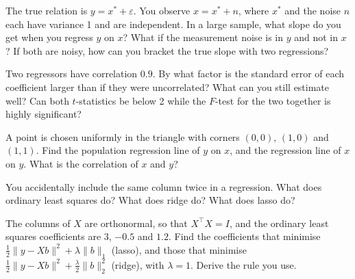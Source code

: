 \begin{question}\label{iq:iv1:regression:10}
The true relation is $y = x^* + \varepsilon$. You observe $x = x^* + n$, where $x^*$ and the noise $n$ each have variance 1 and are independent. In a large sample, what slope do you get when you regress $y$ on $x$? What if the measurement noise is in $y$ and not in $x$? If both are noisy, how can you bracket the true slope with two regressions?
\end{question}

\begin{question}\label{iq:iv1:regression:11}
Two regressors have correlation $0.9$. By what factor is the standard error of each coefficient larger than if they were uncorrelated? What can you still estimate well? Can both $t$-statistics be below 2 while the $F$-test for the two together is highly significant?
\end{question}

\begin{question}\label{iq:iv1:regression:12}
A point is chosen uniformly in the triangle with corners $(0,0)$, $(1,0)$ and $(1,1)$. Find the population regression line of $y$ on $x$, and the regression line of $x$ on $y$. What is the correlation of $x$ and $y$?
\end{question}

\begin{question}\label{iq:iv1:regression:13}
You accidentally include the same column twice in a regression. What does ordinary least squares do? What does ridge do? What does lasso do?
\end{question}

\begin{question}\label{iq:iv1:regression:14}
The columns of $X$ are orthonormal, so that $X^\top X = I$, and the ordinary least squares coefficients are $3$, $-0.5$ and $1.2$. Find the coefficients that minimise $\tfrac12\lVert y - Xb\rVert^2 + \lambda\lVert b\rVert_1$ (lasso), and those that minimise $\tfrac12\lVert y - Xb\rVert^2 + \tfrac{\lambda}{2}\lVert b\rVert_2^2$ (ridge), with $\lambda = 1$. Derive the rule you use.
\end{question}

